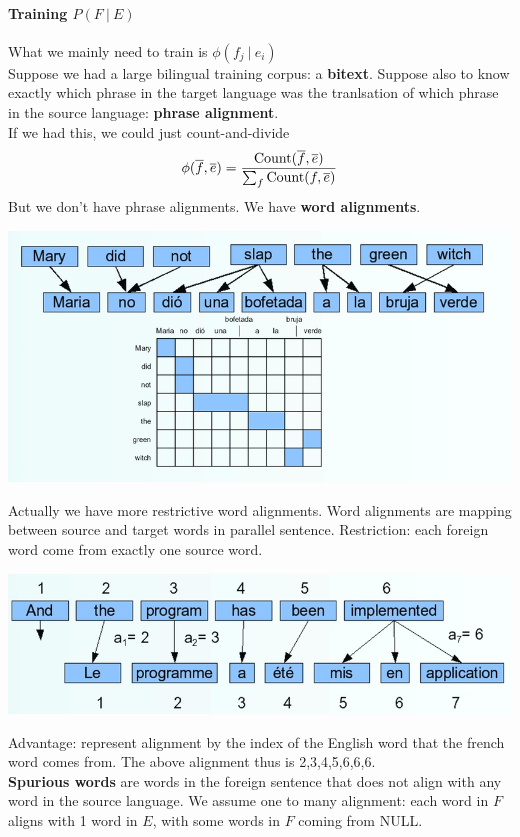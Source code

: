 \documentclass[10pt]{report}
\begin{document}
\paragraph{Training $P(F\:|\:E)$} What we mainly need to train is $\phi(f_j\:|\:e_i)$\\
Suppose we had a large bilingual training corpus: a \textbf{bitext}. Suppose also to know exactly which phrase in the target language was the tranlsation of which phrase in the source language: \textbf{phrase alignment}.\\
If we had this, we could just count-and-divide
$$\phi(\overline{f},\overline{e})=\frac{\hbox{Count}(\overline{f},\overline{e})}{\sum_{f} \hbox{Count}(f,\overline{e})}$$
But we don't have phrase alignments. We have \textbf{word alignments}.
\begin{center}
	\includegraphics[scale=0.5]{43.png}
\end{center}
Actually we have more restrictive word alignments. Word alignments are mapping between source and target words in parallel sentence. Restriction: each foreign word come from exactly one source word.
\begin{center}
	\includegraphics[scale=0.5]{44.png}
\end{center}
Advantage: represent alignment by the index of the English word that the french word comes from. The above alignment thus is 2,3,4,5,6,6,6.\\
\textbf{Spurious words} are words in the foreign sentence that does not align with any word in the source language. We assume one to many alignment: each word in $F$ aligns with 1 word in $E$, with some words in $F$ coming from NULL.
\end{document}

